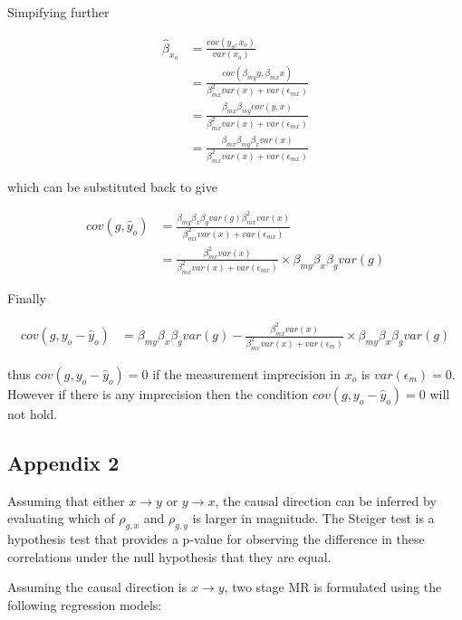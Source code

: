 \documentclass[]{article}
\begin{document}
Simpifying further

\[
\begin{aligned}
\hat{\beta}_{x_o} & = \frac{cov(y_o, x_o)} {var(x_o)} \\
                  & = \frac{cov(\beta_{my} y, \beta_{mx} x)} {\beta_{mx}^2 var(x) + var(\epsilon_{mx})} \\
                  & = \frac{\beta_{mx} \beta_{my} cov(y, x)} {\beta_{mx}^2 var(x) + var(\epsilon_{mx})} \\
                  & = \frac{\beta_{mx} \beta_{my} \beta_x var(x)} {\beta_{mx}^2 var(x) + var(\epsilon_{mx})}
\end{aligned}
\]

which can be substituted back to give

\[
\begin{aligned}
cov(g, \hat{y}_o) & = \frac{\beta_{my} \beta_x \beta_g var(g) \beta_{mx}^2 var(x)} {\beta_{mx}^2 var(x) + var(\epsilon_{mx})} \\
                  & = \frac{\beta_{mx}^2 var(x)} {\beta_{mx}^2 var(x) + var(\epsilon_{mx})} \times \beta_{my} \beta_x \beta_g var(g)
\end{aligned}
\]

Finally

\[
\begin{aligned}
cov(g, y_o - \hat{y}_o) & = \beta_{my} \beta_x \beta_g var(g) - \frac{\beta_{mx}^2 var(x)} {\beta_{mx}^2 var(x) + var(\epsilon_m)} \times \beta_{my} \beta_x \beta_g var(g)
\end{aligned}
\]

thus \(cov(g, y_o - \hat{y}_o) = 0\) if the measurement imprecision in
\(x_o\) is \(var(\epsilon_m) = 0\). However if there is any imprecision
then the condition \(cov(g, y_o - \hat{y}_o) = 0\) will not hold.

\subsection{Appendix 2}\label{appendix-2}

Assuming that either \(x \rightarrow y\) or \(y \rightarrow x\), the
causal direction can be inferred by evaluating which of \(\rho_{g, x}\)
and \(\rho_{g, y}\) is larger in magnitude. The Steiger test is a
hypothesis test that provides a p-value for observing the difference in
these correlations under the null hypothesis that they are equal.

Assuming the causal direction is \(x \to y\), two stage MR is formulated
using the following regression models:
\end{document}
